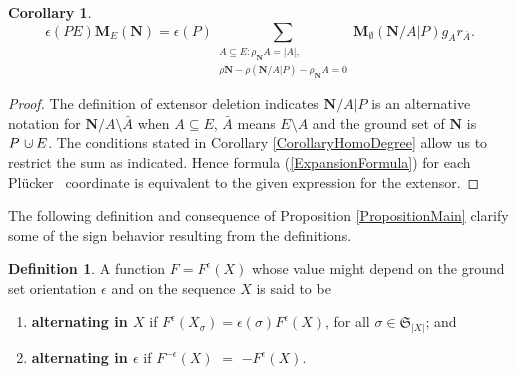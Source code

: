 \documentclass[12pt]{article}
\newtheorem{corollary}[theorem]{Corollary}
\theoremstyle{definition}
\newtheorem{definition}[theorem]{Definition}
\newcommand{\dunion}
{\mbox{\hbox{\hskip6pt$\cdot$\hskip-5.50pt$\cup$\hskip2pt}}}
\newcommand{\scomp}[1]{\ensuremath{\overline{#1}}}
\newcommand{\Perms}{\ensuremath{\mathfrak{S}}}
\newcommand{\rank}{{\rho}}%
\newcommand{\Card}[1]{\ensuremath{{\left|#1\right|}}}
\newcommand{\ext}[1]{\ensuremath{\mathbf{#1}}}
\newcommand{\Plucker}{Pl\"{u}cker\ }
\begin{document}
\begin{corollary}
\label{PairscorollaryMESubsetSum}
\begin{equation}
\label{PairsMESubsetSum}
\epsilon(PE)\ext{M}_E(\ext{N})=\epsilon(P)\sum_
             {\begin{array}{c}
                A\subseteq E:
	\rank_{\ext{N}}{A}=\Card{A},\\
	\rank{\ext{N}}-\rank{(\ext{N}/A|P)}-
        \rank_{\ext{N}}{A}=0
               \end{array}}
    \ext{M}_\emptyset(\ext{N}/A|P) g_Ar_{\scomp{A}}.
\end{equation}
\end{corollary}

\begin{proof}

The definition of extensor deletion indicates 
$\ext{N}/A|P$ is an alternative notation
for $\ext{N}/A\setminus\bar{A}$ when $A\subseteq E$,
$\bar{A}$ means $E\setminus A$ and the
ground set of $\ext{N}$ is $P\dunion E$.  The conditions
stated in Corollary \ref{CorollaryHomoDegree}
allow us to restrict the sum as indicated.
Hence
formula (\ref{ExpansionFormula}) for each \Plucker
coordinate is equivalent to the given expression 
for the extensor.
\end{proof}


The following definition and consequence of 
Proposition \ref{PropositionMain} clarify some 
of the sign behavior resulting from the definitions.


\begin{definition}
A function $F=F^\epsilon(X)$ whose value might depend on
the ground set orientation $\epsilon$ and on the sequence $X$ is said to be
\begin{enumerate}
\item \textbf{alternating in $X$} if $F^\epsilon(X_\sigma) = 
\epsilon(\sigma)F^\epsilon(X)$, for all
$\sigma\in\Perms_{\Card{X}}$; and
\item \textbf{alternating in $\epsilon$} if $F^{-\epsilon}(X)$ $=$
$-F^\epsilon(X)$.
\end{enumerate}
\end{definition}
\end{document}
